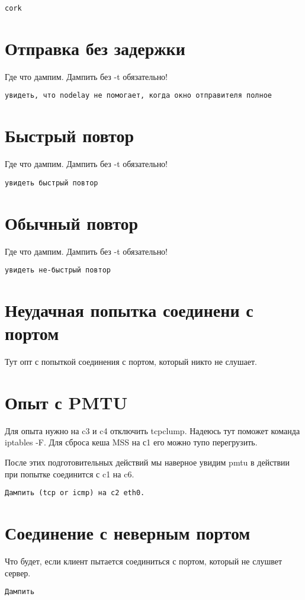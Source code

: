 \documentclass[a4paper,12pt]{article}
\begin{document}
\begin{Verbatim}
cork
\end{Verbatim}

\section{Отправка без задержки}

Где что дампим.  Дампить без -t обязательно!

\begin{Verbatim}
увидеть, что nodelay не помогает, когда окно отправителя полное
\end{Verbatim}

\section{Быстрый повтор}

Где что дампим.  Дампить без -t обязательно!

\begin{Verbatim}
увидеть быстрый повтор
\end{Verbatim}

\section{Обычный повтор}

Где что дампим. Дампить без -t обязательно!

\begin{Verbatim}
увидеть не-быстрый повтор
\end{Verbatim}

\section{Неудачная попытка соединени с портом}

Тут опт с попыткой соединения с портом, который никто не слушает.

\section{Опыт с PMTU}

Для опыта нужно на c3 и c4 отключить tcpclump.
Надеюсь тут поможет команда iptables -F.
Для сброса кеша MSS на с1 его можно тупо перегрузить.

После этих подготовительных действий мы наверное увидим pmtu в действии при попытке соединится с c1 на c6.

\begin{Verbatim}
Дампить (tcp or icmp) на c2 eth0.
\end{Verbatim}

\section{Соединение с неверным портом}

Что будет, если клиент пытается соединиться с портом, который не слушвет сервер.

\begin{Verbatim}
Дампить
\end{Verbatim}
\end{document}
